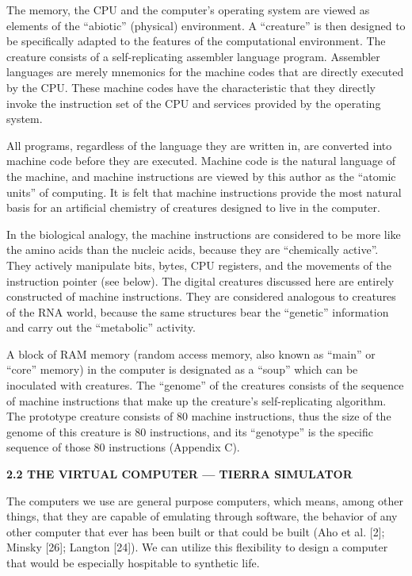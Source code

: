 The memory, the CPU and the computer's operating system are viewed as elements
of the ``abiotic'' (physical) environment.  A ``creature'' is then designed
to be specifically adapted to the features of the computational environment.
The creature consists of a self-replicating assembler language program.
Assembler languages are merely mnemonics for the machine codes that are
directly executed by the CPU.  These machine codes have the characteristic
that they directly invoke the instruction set of the CPU and services provided
by the operating system.

All programs, regardless of the language they are written in, are converted
into machine code before they are executed.  Machine code is the natural
language of the machine, and machine instructions are viewed by this
author as the ``atomic units'' of computing.  It is felt that machine
instructions provide the most natural basis for an artificial chemistry
of creatures designed to live in the computer.

In the biological analogy, the machine instructions are considered to be
more like the amino acids than the nucleic acids, because they are
``chemically active''.  They actively manipulate bits, bytes, CPU registers,
and the movements of the instruction pointer (see below).  The digital
creatures discussed here are entirely constructed of machine instructions.
They are considered analogous to creatures of the RNA world, because the
same structures bear the ``genetic'' information and carry out the
``metabolic'' activity.

A block of RAM memory (random access memory, also known as ``main'' or
``core'' memory) in the computer is designated as a ``soup'' which can
be inoculated with creatures.  The ``genome'' of the creatures consists of
the sequence of machine instructions that make up the creature's
self-replicating algorithm.  The prototype creature consists of 80 machine
instructions, thus the size of the genome of this creature is 80 instructions,
and its ``genotype'' is the specific sequence of those 80 instructions
(Appendix C).

\LP
\bf 2.2 THE VIRTUAL COMPUTER --- TIERRA SIMULATOR\rm
\eLP

The computers we use are general purpose computers, which means, among
other things, that they are capable of emulating through software, the
behavior of any other computer that ever has been built or that could be
built (Aho et al. [2]; Minsky [26]; Langton [24]).  We can utilize
this flexibility to design a computer that would be especially hospitable
to synthetic life.

